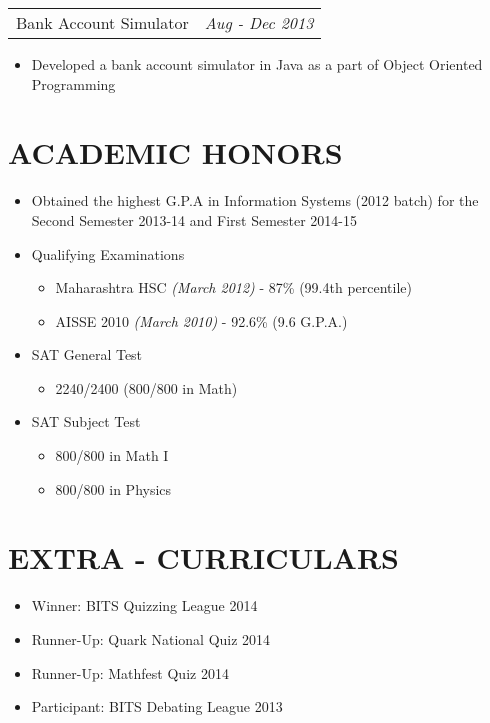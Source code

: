 \documentclass[margin]{res}
\begin{document}
\begin{resume}
                 \begin{tabular}{p{4.2in} r} %
                  Bank Account Simulator &  \textit{Aug - Dec 2013}
                 \end{tabular}
                  \begin{itemize}					        
                   \item[] Developed a bank account simulator in Java as a part of Object Oriented \\Programming 
                  \end{itemize}
                  
 

                  

\section{ACADEMIC HONORS} 
			\begin{itemize}
			
				  \item Obtained the highest G.P.A in Information Systems (2012 batch) for the Second Semester 2013-14 and First Semester 2014-15
                  \item Qualifying Examinations 
                  	\begin{itemize}
                  	\item Maharashtra HSC \textit{(March 2012)} - 87\% (99.4th percentile)
                      	\item AISSE 2010 \textit{(March 2010)} - 92.6\% (9.6 G.P.A.)
                  	\end{itemize}
                  \item SAT General Test
                  	\begin{itemize}
                  	\item 2240/2400 (800/800 in Math)
                  	\end{itemize}
                  	\item SAT Subject Test
                  	\begin{itemize}
                  	\item 800/800 in Math I
                  	\item 800/800 in Physics
                  	\end{itemize}
                  \end{itemize}
			   	
\section{EXTRA - CURRICULARS}
		\begin{itemize}
			\item Winner: BITS Quizzing League 2014
			\item Runner-Up: Quark National Quiz 2014
			\item Runner-Up: Mathfest Quiz 2014
			\item Participant: BITS Debating League 2013
		\end{itemize}

\end{resume}
\end{document}
